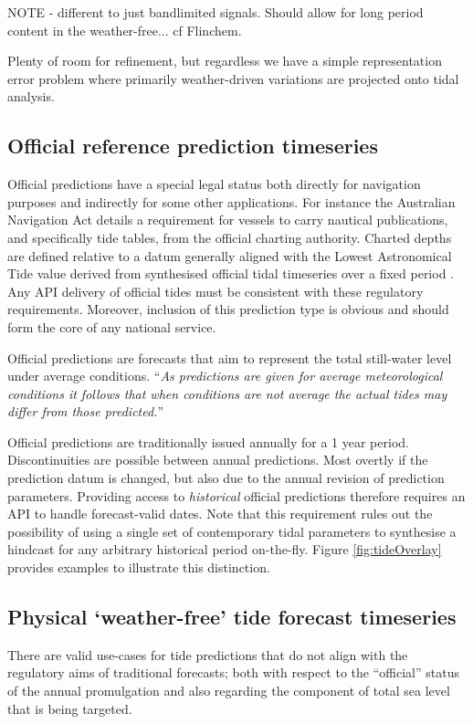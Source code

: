 NOTE - different to just bandlimited signals.  Should allow for long period content in the weather-free... cf Flinchem.


Plenty of room for refinement, but regardless we have a simple representation error problem where primarily weather-driven variations are projected onto tidal analysis.
 
\subsection{Official reference prediction timeseries}
\label{Sec:flavour1}
Official predictions have a special legal status both directly for  navigation purposes and indirectly for some other applications.   
For instance the Australian Navigation Act \cite{AusNavAct2012} details a requirement for vessels to carry nautical publications, and specifically tide tables, from the official charting authority.  Charted depths are defined relative to a datum generally aligned with the Lowest Astronomical Tide value derived from synthesised official tidal timeseries over a fixed period \cite{PCTMSL-sp9}.
Any API delivery of official tides must be consistent with these regulatory requirements.  Moreover, inclusion of this prediction type is obvious and should form the core of any national service.


Official predictions are forecasts that aim to represent the total still-water level under average conditions. ``\textit{As predictions are given for average meteorological conditions it follows that when conditions are not average the actual tides may differ from those predicted.}''\citep{austides}


Official predictions are traditionally issued annually for a 1 year period.  
Discontinuities are possible between annual predictions. Most overtly if the prediction datum is changed,  but also due to the annual revision of prediction parameters.
Providing access to \textit{historical} official predictions therefore requires an API to handle forecast-valid dates.  Note that this requirement rules out the possibility of using a single set of contemporary tidal parameters to synthesise a hindcast for any arbitrary historical period on-the-fly.
Figure \ref{fig:tideOverlay} provides examples to illustrate this distinction. 

\subsection{Physical `weather-free' tide forecast timeseries}   
\label{Sec:flavour2}
There are valid use-cases for tide predictions that do not align with the regulatory aims of traditional forecasts; both with respect to the ``official'' status of the annual promulgation and also regarding the component of total sea level that is being targeted.

